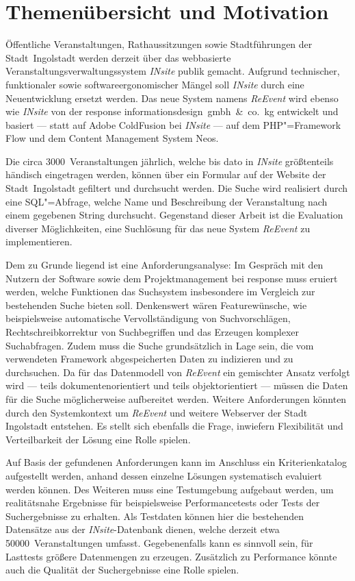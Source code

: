 
\chapter{Themenübersicht und Motivation}

Öffentliche Veranstaltungen, Rathaussitzungen sowie Stadtführungen der Stadt~Ingolstadt werden derzeit über das webbasierte Veranstaltungsverwaltungssystem \emph{INsite} publik gemacht. Aufgrund technischer, funktionaler sowie softwareergonomischer Mängel soll \emph{INsite} durch eine Neuentwicklung ersetzt werden. Das neue System namens \emph{ReEvent} wird ebenso wie \emph{INsite} von der response informationsdesign~gmbh~\&~co.~kg entwickelt und basiert --- statt auf Adobe ColdFusion bei \emph{INsite} --- auf dem PHP"=Framework Flow und dem Content Management System Neos.

Die circa 3000~Veranstaltungen jährlich, welche bis dato in \emph{INsite} größtenteils händisch eingetragen werden, können über ein Formular auf der Website der Stadt~Ingolstadt gefiltert und durchsucht werden. Die Suche wird realisiert durch eine SQL"=Abfrage, welche Name und Beschreibung der Veranstaltung nach einem gegebenen String durchsucht. Gegenstand dieser Arbeit ist die Evaluation diverser Möglichkeiten, eine Suchlösung für das neue System \emph{ReEvent} zu implementieren.

Dem zu Grunde liegend ist eine Anforderungsanalyse: Im Gespräch mit den Nutzern der Software sowie dem Projektmanagement bei response muss eruiert werden, welche Funktionen das Suchsystem insbesondere im Vergleich zur bestehenden Suche bieten soll. Denkenswert wären Featurewünsche, wie beispielsweise automatische Vervollständigung von Suchvorschlägen, Rechtschreibkorrektur von Suchbegriffen und das Erzeugen komplexer Suchabfragen. Zudem muss die Suche grundsätzlich in Lage sein, die vom verwendeten Framework abgespeicherten Daten zu indizieren und zu durchsuchen. Da für das Datenmodell von \emph{ReEvent} ein gemischter Ansatz verfolgt wird --- teils dokumentenorientiert und teils objektorientiert --- müssen die Daten für die Suche möglicherweise aufbereitet werden. Weitere Anforderungen könnten durch den Systemkontext um \emph{ReEvent} und weitere Webserver der Stadt Ingolstadt entstehen. Es stellt sich ebenfalls die Frage, inwiefern Flexibilität und Verteilbarkeit der Lösung eine Rolle spielen.

Auf Basis der gefundenen Anforderungen kann im Anschluss ein Kriterienkatalog aufgestellt werden, anhand dessen einzelne Lösungen systematisch evaluiert werden können. Des Weiteren muss eine Testumgebung aufgebaut werden, um realitätsnahe Ergebnisse für beispielsweise Performancetests oder Tests der Suchergebnisse zu erhalten. Als Testdaten können hier die bestehenden Datensätze aus der \emph{INsite}-Datenbank dienen, welche derzeit etwa 50000~Veranstaltungen umfasst. Gegebenenfalls kann es sinnvoll sein, für Lasttests größere Datenmengen zu erzeugen. Zusätzlich zu Performance könnte auch die Qualität der Suchergebnisse eine Rolle spielen.

